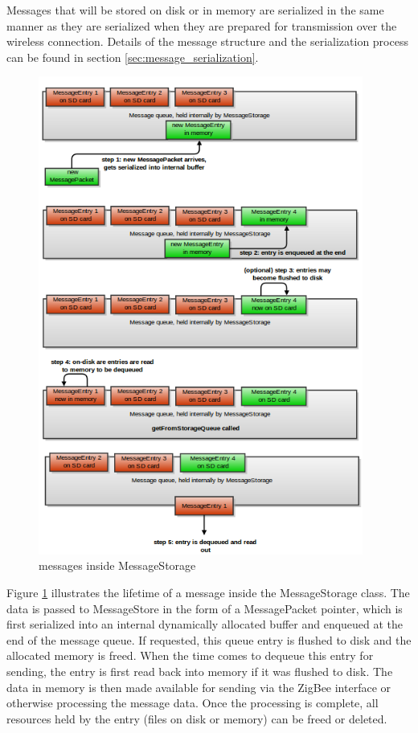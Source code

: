 Messages that will be stored on disk or in memory are serialized in the same manner as they are serialized when they are prepared for transmission over the wireless connection. Details of the message structure and the serialization process can be found in section \ref{sec:message_serialization}.

\begin{figure}[htb]
\centering
\includegraphics[width=0.95\textwidth]{Images/message_storage_lifecycle}
\caption{ messages inside MessageStorage}
\label{fig:class_message_storage_dynamic}
\end{figure}

Figure \ref{fig:class_message_storage_dynamic} illustrates the lifetime of a message inside the MessageStorage class. The data is passed to MessageStore in the form of a MessagePacket pointer, which is first serialized into an internal dynamically allocated buffer and enqueued at the end of the message queue. If requested, this queue entry is flushed to disk and the allocated memory is freed. When the time comes to dequeue this entry for sending, the entry is first read back into memory if it was flushed to disk. The data in memory is then made available for sending via the ZigBee interface or otherwise processing the message data. Once the processing is complete, all resources held by the entry (files on disk or memory) can be freed or deleted.

